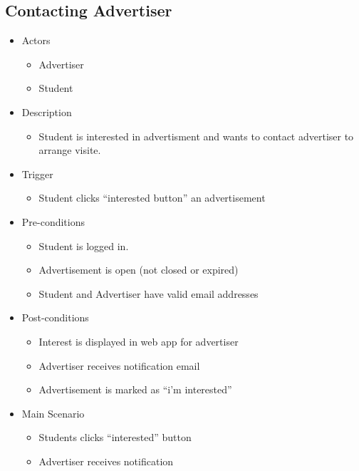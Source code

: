 \documentclass[a4paper,11pt]{article}
\begin{document}
\subsection*{Contacting Advertiser}
\begin{itemize}
  \item Actors
    \begin{itemize}
      \item Advertiser
      \item Student
    \end{itemize}
  \item Description
    \begin{itemize}
      \item Student is interested in advertisment and wants to contact advertiser to arrange visite.
    \end{itemize}
 \item Trigger
    \begin{itemize}
      \item Student clicks “interested button” an advertisement
    \end{itemize}
  \item Pre-conditions
    \begin{itemize}
    \item Student is logged in.
    \item Advertisement is open (not closed or expired)
    \item Student and Advertiser have valid email addresses
    \end{itemize}
  \item Post-conditions
    \begin{itemize}
      \item Interest is displayed in web app for advertiser
      \item Advertiser receives notification email
      \item Advertisement is marked as “i'm interested”
    \end{itemize}
  \item Main Scenario
    \begin{itemize}
      \item Students clicks “interested” button
      \item Advertiser receives notification
    \end{itemize}
\end{itemize}
\end{document}
